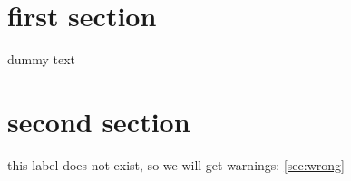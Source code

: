 \documentclass{article}
\begin{document}
\section{first section}
\label{sec:first-section}

dummy text

\clearpage

\section{second section}
\label{sec:second-section}

this label does not exist, so we will get warnings: \ref{sec:wrong} 
\end{document}
